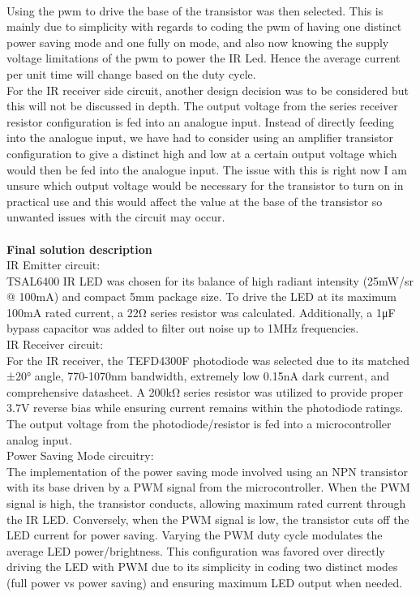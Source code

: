 \documentclass[class=report,11pt,crop=false]{standalone}
\begin{document}
\\
Using the pwm to drive the base of the transistor was then selected. This is mainly due to simplicity with regards to coding the pwm of having one distinct power saving mode and one fully on mode, and also now knowing the supply voltage limitations of the pwm to power the IR Led. Hence the average current per unit time will change based on the duty cycle.\\
For the IR receiver side circuit, another design decision was to be considered but this will not be discussed in depth. The output voltage from the series receiver resistor configuration is fed into an analogue input. Instead of directly feeding into the analogue input, we have had to consider using an amplifier transistor configuration to give a distinct high and low at a certain output voltage which would then be fed into the analogue input. The issue with this is right now I am unsure which output voltage would be necessary for the transistor to turn on in practical use and this would affect the value at the base of the transistor so unwanted issues with the circuit may occur. \\\\
\textbf{Final solution description} \\
IR Emitter circuit:\\
TSAL6400 IR LED was chosen for its balance of high radiant intensity (25mW/sr @ 100mA) and compact 5mm package size. To drive the LED at its maximum 100mA rated current, a 22Ω series resistor was calculated. Additionally, a 1μF bypass capacitor was added to filter out noise up to 1MHz frequencies.
\\IR Receiver circuit:\\
For the IR receiver, the TEFD4300F photodiode was selected due to its matched ±20° angle, 770-1070nm bandwidth, extremely low 0.15nA dark current, and comprehensive datasheet. A 200kΩ series resistor was utilized to provide proper 3.7V reverse bias while ensuring current remains within the photodiode ratings. The output voltage from the photodiode/resistor is fed into a microcontroller analog input.
\\Power Saving Mode circuitry:\\
The implementation of the power saving mode involved using an NPN transistor with its base driven by a PWM signal from the microcontroller. When the PWM signal is high, the transistor conducts, allowing maximum rated current through the IR LED. Conversely, when the PWM signal is low, the transistor cuts off the LED current for power saving. Varying the PWM duty cycle modulates the average LED power/brightness. This configuration was favored over directly driving the LED with PWM due to its simplicity in coding two distinct modes (full power vs power saving) and ensuring maximum LED output when needed.
\end{document}
